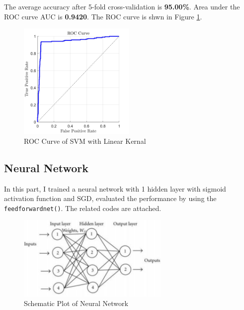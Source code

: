 \documentclass[a4paper,12pt]{article} %
\begin{document}
\hspace{0.7cm}
The average accuracy after 5-fold cross-validation is \textbf{95.00\%}. Area under the ROC curve AUC is \textbf{0.9420}. The ROC curve is shwn in Figure \ref{fig:roc2}.

\begin{figure}[!htbp]
	\centering
	\includegraphics[width=0.5\textwidth]{LROC.jpg}
	\caption{ROC Curve of SVM with Linear Kernal}
	\label{fig:roc2}
\end{figure}

\subsection{Neural Network}
\hspace{0.7cm}
In this part, I trained a neural network with 1 hidden layer with sigmoid activation function and SGD, evaluated the performance by using the \texttt{feedforwardnet()}. The related codes are attached.

\begin{figure}[!htbp]
	\centering
	\includegraphics[width=0.65\textwidth]{NN.png}
	\caption{Schematic Plot of Neural Network}
	\label{fig:roc3}
\end{figure}
\end{document}
